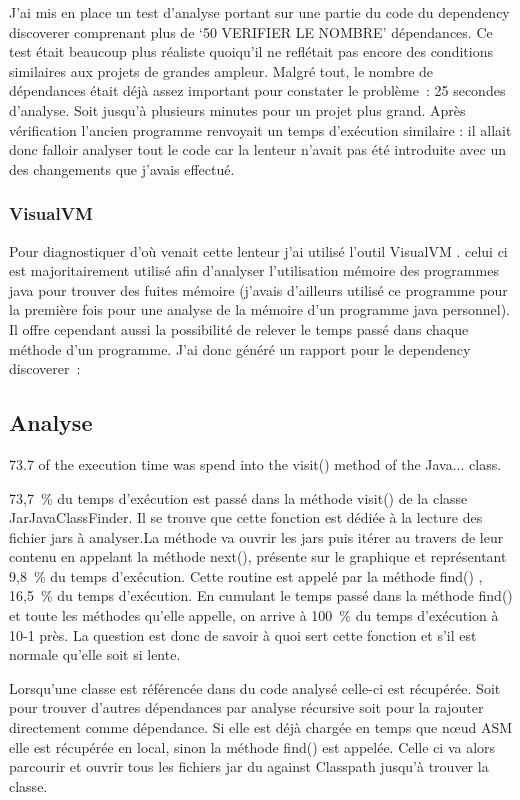 \documentclass[french,a4paper,12pt]{report}
\begin{document}
J’ai mis en place un test d’analyse portant sur une partie du code du dependency discoverer comprenant plus de ‘50 VERIFIER LE NOMBRE’ dépendances. Ce test était beaucoup plus réaliste quoiqu'il ne reflétait pas encore des conditions similaires aux projets de grandes ampleur. Malgré tout, le nombre de dépendances était déjà assez important pour constater le problème : 25 secondes d’analyse. Soit jusqu’à plusieurs minutes pour un projet plus grand. Après vérification l’ancien programme renvoyait un temps d’exécution similaire : il allait donc falloir analyser tout le code car la lenteur n'avait pas été introduite avec un des changements que j'avais effectué. 

\subsubsection{VisualVM}

Pour diagnostiquer d’où venait cette lenteur j’ai utilisé l’outil VisualVM . celui ci est majoritairement utilisé afin d’analyser l’utilisation mémoire des programmes java pour trouver des fuites mémoire (j’avais d’ailleurs utilisé ce programme pour la première fois pour une analyse de la mémoire d’un programme java personnel). Il offre cependant aussi la possibilité de relever le temps passé dans chaque méthode d’un programme. J’ai donc généré un rapport pour le dependency discoverer :


\subsection{Analyse}

73.7 of the execution time was spend into the visit() method of the Java... class.

73,7 \% du temps d’exécution est passé dans la méthode visit() de la classe JarJavaClassFinder. Il se trouve que cette fonction est dédiée à la lecture des fichier jars à analyser.La méthode va ouvrir les jars puis itérer au travers de leur contenu en appelant la méthode next(), présente sur le graphique et représentant 9,8 \% du temps d’exécution. Cette routine est appelé par la méthode find() , 16,5 \% du temps d’exécution. En cumulant le temps passé dans la méthode find() et toute les méthodes qu'elle appelle, on arrive à 100 \% du temps d’exécution à 10-1 près. La question est donc de savoir à quoi sert cette fonction et s'il est normale qu’elle soit si lente.

Lorsqu’une classe est référencée dans du code analysé celle-ci est récupérée. Soit pour trouver d’autres dépendances par analyse récursive soit pour la rajouter directement comme dépendance. Si elle est déjà chargée en temps que nœud ASM elle est récupérée en local, sinon la méthode find() est appelée. Celle ci va alors parcourir et ouvrir tous les fichiers jar du against Classpath jusqu’à trouver la classe.
\end{document}
